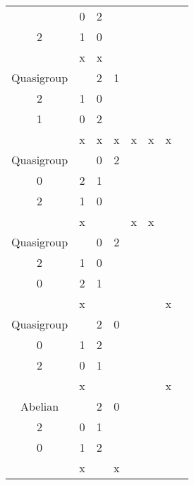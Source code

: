 \begin{longtable}{| c | c | c | c | c | c | c | c |}
\begin{smallmatrix}
    1 & 0 & 2 \\
    2 & 1 & 0 \\
\end{smallmatrix} \)
 &  \cellcolor[HTML]{AA0044} x & \cellcolor[HTML]{AA0044} x &   &   &   &   \\ \hline
    Quasigroup &
\( \begin{smallmatrix}
    0 & 2 & 1 \\
    2 & 1 & 0 \\
    1 & 0 & 2 \\
\end{smallmatrix} \)
 &  \cellcolor[HTML]{AA0044} x & \cellcolor[HTML]{AA0044} x & \cellcolor[HTML]{AA0044} x & \cellcolor[HTML]{AA0044} x & \cellcolor[HTML]{AA0044} x & \cellcolor[HTML]{AA0044} x \\ \hline
    Quasigroup &
\( \begin{smallmatrix}
    1 & 0 & 2 \\
    0 & 2 & 1 \\
    2 & 1 & 0 \\
\end{smallmatrix} \)
 &  \cellcolor[HTML]{AA0044} x &   &   & \cellcolor[HTML]{AA0044} x & \cellcolor[HTML]{AA0044} x &   \\ \hline
    Quasigroup &
\( \begin{smallmatrix}
    1 & 0 & 2 \\
    2 & 1 & 0 \\
    0 & 2 & 1 \\
\end{smallmatrix} \)
 &  \cellcolor[HTML]{AA0044} x &   &   &   &   & \cellcolor[HTML]{AA0044} x \\ \hline
    Quasigroup &
\( \begin{smallmatrix}
    1 & 2 & 0 \\
    0 & 1 & 2 \\
    2 & 0 & 1 \\
\end{smallmatrix} \)
 &  \cellcolor[HTML]{AA0044} x &   &   &   &   & \cellcolor[HTML]{AA0044} x \\ \hline
    \rowcolor{cyan} Abelian &
\( \begin{smallmatrix}
    1 & 2 & 0 \\
    2 & 0 & 1 \\
    0 & 1 & 2 \\
\end{smallmatrix} \)
 &  \cellcolor[HTML]{AA0044} x &   & \cellcolor[HTML]{AA0044} x &   &   &   \\ \hline

\end{longtable}
